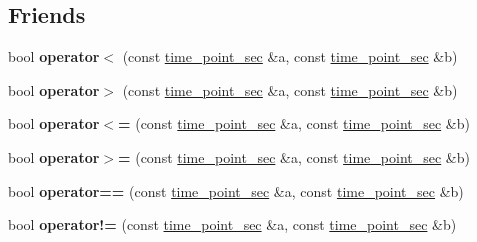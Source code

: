 \subsection*{Friends}
\begin{DoxyCompactItemize}
\item 
\mbox{\label{classfc_1_1time__point__sec_adf55a60cc15afb538eb8d5bf3a838b35}} 
bool {\bfseries operator$<$} (const \mbox{\hyperlink{classfc_1_1time__point__sec}{time\+\_\+point\+\_\+sec}} \&a, const \mbox{\hyperlink{classfc_1_1time__point__sec}{time\+\_\+point\+\_\+sec}} \&b)
\item 
\mbox{\label{classfc_1_1time__point__sec_aaaeb236eab5e19e5657e60b73c92e6c1}} 
bool {\bfseries operator$>$} (const \mbox{\hyperlink{classfc_1_1time__point__sec}{time\+\_\+point\+\_\+sec}} \&a, const \mbox{\hyperlink{classfc_1_1time__point__sec}{time\+\_\+point\+\_\+sec}} \&b)
\item 
\mbox{\label{classfc_1_1time__point__sec_a2ad8fce220805a5529f16e6ac1698728}} 
bool {\bfseries operator$<$=} (const \mbox{\hyperlink{classfc_1_1time__point__sec}{time\+\_\+point\+\_\+sec}} \&a, const \mbox{\hyperlink{classfc_1_1time__point__sec}{time\+\_\+point\+\_\+sec}} \&b)
\item 
\mbox{\label{classfc_1_1time__point__sec_a3e7839d4f7e9cc5a49d580b398b6ee5e}} 
bool {\bfseries operator$>$=} (const \mbox{\hyperlink{classfc_1_1time__point__sec}{time\+\_\+point\+\_\+sec}} \&a, const \mbox{\hyperlink{classfc_1_1time__point__sec}{time\+\_\+point\+\_\+sec}} \&b)
\item 
\mbox{\label{classfc_1_1time__point__sec_ad97eba5244d2729349e69939e68fc939}} 
bool {\bfseries operator==} (const \mbox{\hyperlink{classfc_1_1time__point__sec}{time\+\_\+point\+\_\+sec}} \&a, const \mbox{\hyperlink{classfc_1_1time__point__sec}{time\+\_\+point\+\_\+sec}} \&b)
\item 
\mbox{\label{classfc_1_1time__point__sec_a9bbbbf540848bdf3829b810d542e8b4f}} 
bool {\bfseries operator!=} (const \mbox{\hyperlink{classfc_1_1time__point__sec}{time\+\_\+point\+\_\+sec}} \&a, const \mbox{\hyperlink{classfc_1_1time__point__sec}{time\+\_\+point\+\_\+sec}} \&b)

\end{DoxyCompactItemize}
